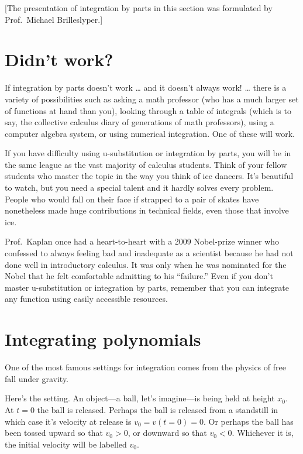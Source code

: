 \documentclass[
  letterpaper,
  DIV=11,
  numbers=noendperiod,
  oneside]{scrreprt}
\begin{document}
{[}The presentation of integration by parts in this section was
formulated by Prof.~Michael Brilleslyper.{]}

\hypertarget{didnt-work}{%
\section{Didn't work?}\label{didnt-work}}

If integration by parts doesn't work \ldots{} and it doesn't always
work! \ldots{} there is a variety of possibilities such as asking a math
professor (who has a much larger set of functions at hand than you),
looking through a table of integrals (which is to say, the collective
calculus diary of generations of math professors), using a computer
algebra system, or using numerical integration. One of these will work.

If you have difficulty using u-substitution or integration by parts, you
will be in the same league as the vast majority of calculus students.
Think of your fellow students who master the topic in the way you think
of ice dancers. It's beautiful to watch, but you need a special talent
and it hardly solves every problem. People who would fall on their face
if strapped to a pair of skates have nonetheless made huge contributions
in technical fields, even those that involve ice.

Prof.~Kaplan once had a heart-to-heart with a 2009 Nobel-prize winner
who confessed to always feeling bad and inadequate as a scientist
because he had not done well in introductory calculus. It was only when
he was nominated for the Nobel that he felt comfortable admitting to his
``failure.'' Even if you don't master u-substitution or integration by
parts, remember that you can integrate any function using easily
accessible resources.

\hypertarget{integrating-polynomials}{%
\section{Integrating polynomials}\label{integrating-polynomials}}

One of the most famous settings for integration comes from the physics
of free fall under gravity.

Here's the setting. An object---a ball, let's imagine---is being held at
height \(x_0\). At \(t=0\) the ball is released. Perhaps the ball is
released from a standstill in which case it's velocity at release is
\(v_0 = v(t=0) =0\). Or perhaps the ball has been tossed upward so that
\(v_0 > 0\), or downward so that \(v_0 < 0\). Whichever it is, the
initial velocity will be labelled \(v_0\).
\end{document}
